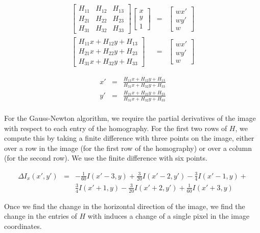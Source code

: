 \documentclass[float=false, crop=false]{standalone}
\begin{document}
\begin{eqnarray*}
\left[\begin{array}{ccc}
H_{11} & H_{12} & H_{13}\\
H_{21} & H_{22} & H_{23}\\
H_{31} & H_{32} & H_{33}
\end{array}\right]
\left[\begin{array}{c}x\\y\\1\end{array}\right] &=&
\left[\begin{array}{c}wx'\\wy'\\w\end{array}\right]\\
\left[\begin{array}{c}
H_{11}x + H_{12}y + H_{13}\\
H_{21}x + H_{22}y + H_{23}\\
H_{31}x + H_{32}y + H_{33}
\end{array}\right]
&=& \left[\begin{array}{c}wx'\\wy'\\w\end{array}\right]
\end{eqnarray*}

\begin{eqnarray*}
x' &=& \frac{H_{11}x + H_{12}y + H_{13}}{H_{31}x + H_{32}y + H_{33}}\\
y' &=& \frac{H_{21}x + H_{22}y + H_{23}}{H_{31}x + H_{32}y + H_{33}}\\
\end{eqnarray*}

For the Gauss-Newton algorithm, we require the partial derivatives of the image
with respect to each entry of the homography. For the first two rows of $H$, we
compute this by taking a finite difference with three points on the image, either
over a row in the image (for the first row of the homography) or over a column 
(for the second row). We use the finite difference with six points.

\begin{eqnarray*}
	\Delta I_x(x', y') &=& -\frac{1}{60}I(x'-3, y) + \frac{3}{20}I(x'-2, y') - \frac{3}{4} I(x'-1, y) +\\
			&& \frac{3}{4} I(x'+1, y) -\frac{3}{20}I(x'+2, y') + \frac{1}{60}I(x'+3, y)
\end{eqnarray*}

Once we find the change in the horizontal direction of the image, we find the change in the entries of $H$ with induces
a change of a single pixel in the image coordinates.
\end{document}
